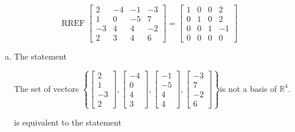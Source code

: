 \begin{exerciseAnswer} 


\[\operatorname{RREF} \left[\begin{array}{cccc}
2 & -4 & -1 & -3 \\
1 & 0 & -5 & 7 \\
-3 & 4 & 4 & -2 \\
2 & 3 & 4 & 6
\end{array}\right] = \left[\begin{array}{cccc}
1 & 0 & 0 & 2 \\
0 & 1 & 0 & 2 \\
0 & 0 & 1 & -1 \\
0 & 0 & 0 & 0
\end{array}\right] \]


\begin{enumerate}[(a)]
\item The statement 
\begin{center}\begin{minipage}{0.8\textwidth}
 The set of vectors \( \left\{ \left[\begin{array}{c}
2 \\
1 \\
-3 \\
2
\end{array}\right] , \left[\begin{array}{c}
-4 \\
0 \\
4 \\
3
\end{array}\right] , \left[\begin{array}{c}
-1 \\
-5 \\
4 \\
4
\end{array}\right] , \left[\begin{array}{c}
-3 \\
7 \\
-2 \\
6
\end{array}\right] \right\} \)is not a basis of \(\mathbb{R}^4\). 
\end{minipage}\end{center}
     is equivalent to the statement 
\begin{center}\begin{minipage}{0.8\textwidth}
 The set of vectors \( \left\{ \left[\begin{array}{c}
2 \\
1 \\

\end{array}
\end{minipage}
\end{center}
\end{enumerate}
\end{exerciseAnswer}

